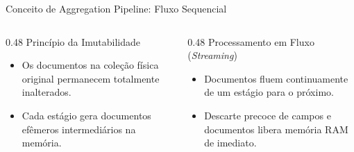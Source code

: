 \begin{frame}{Conceito de Aggregation Pipeline: Fluxo Sequencial}
  \vspace{0.15cm}
  \begin{columns}[t,onlytextwidth]
    \begin{column}{0.48\textwidth}
      \alert{Princípio da Imutabilidade}\par
      \footnotesize
      \begin{itemize}
        \item Os documentos na coleção física original permanecem totalmente inalterados.
        \item Cada estágio gera documentos efêmeros intermediários na memória.
      \end{itemize}
    \end{column}
    \begin{column}{0.48\textwidth}
      \alert{Processamento em Fluxo (\textit{Streaming})}\par
      \footnotesize
      \begin{itemize}
        \item Documentos fluem continuamente de um estágio para o próximo.
        \item Descarte precoce de campos e documentos libera memória RAM de imediato.
      \end{itemize}
    \end{column}
  \end{columns}
\end{frame}

